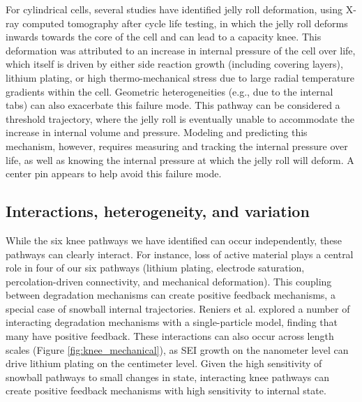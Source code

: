 \documentclass[journal=jpclcd,manuscript=article]{achemso}
\begin{document}
For cylindrical cells, several studies\cite{waldmann_mechanical_2014, pfrang_long-term_2018, pfrang_geometrical_2019, carter_mechanical_2019, kok_virtual_2019} have identified jelly roll deformation, using X-ray computed tomography after cycle life testing, in which the jelly roll deforms inwards towards the core of the cell and can lead to a capacity knee. This deformation was attributed to an increase in internal pressure of the cell over life, which itself is driven by either side reaction growth (including covering layers)\cite{willenberg_development_2020}{}, lithium plating\cite{carter_mechanical_2019}{}, or high thermo-mechanical stress due to large radial temperature gradients within the cell\cite{waldmann_mechanical_2014}{}. Geometric heterogeneities (e.g., due to the internal tabs) can also exacerbate this failure mode.\cite{pfrang_long-term_2018, pfrang_geometrical_2019}
This pathway can be considered a threshold trajectory, where the jelly roll is eventually unable to accommodate the increase in internal volume and pressure. Modeling and predicting this mechanism, however, requires measuring and tracking the internal pressure over life, as well as knowing the internal pressure at which the jelly roll will deform. A center pin appears to help avoid this failure mode.\cite{waldmann_mechanical_2014, carter_mechanical_2019}

\subsection{Interactions, heterogeneity, and variation}

While the six knee pathways we have identified can occur independently, these pathways can clearly interact. For instance, loss of active material plays a central role in four of our six pathways (lithium plating, electrode saturation, percolation-driven connectivity, and mechanical deformation). This coupling between degradation mechanisms can create positive feedback mechanisms, a special case of snowball internal trajectories.
Reniers et al.\cite{reniers_review_2019} explored a number of interacting degradation mechanisms with a single-particle model, finding that many have positive feedback. These interactions can also occur across length scales (Figure \ref{fig:knee_mechanical}), as SEI growth on the nanometer level can drive lithium plating on the centimeter level.
Given the high sensitivity of snowball pathways to small changes in state, interacting knee pathways can create positive feedback mechanisms with high sensitivity to internal state.
\end{document}
